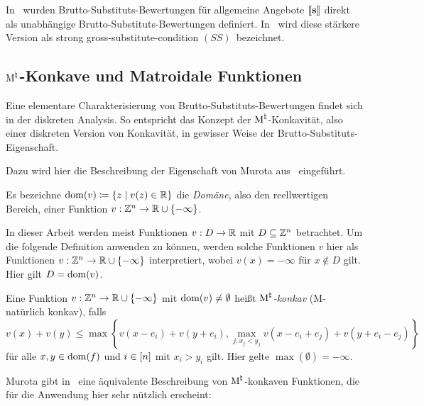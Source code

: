 \begin{bemerkung}
	In~\cite{PaesLeme2018} wurden Brutto-Substituts-Bewertungen für allgemeine Angebote $\left\llbracket \mathbf{s} \right\rrbracket$ direkt als unabhängige Brutto-Substituts-Bewertungen definiert.
	In~\cite{AkiyoshiShioura2015} wird diese stärkere Version als \glqq strong gross-substitute-condition $(SS)$\grqq\ bezeichnet.
\end{bemerkung}

\subsection{$\textrm{\textup{M}}^\natural$-Konkave und Matroidale Funktionen}\label{section-m-concavity}

Eine elementare Charakterisierung von Brutto-Substituts-Bewertungen findet sich in der diskreten Analysis.
So entspricht das Konzept der $\textrm{\textup{M}}^\natural$-Konkavität, also einer diskreten Version von Konkavität, in gewisser Weise der Brutto-Substituts-Eigenschaft.

Dazu wird hier die Beschreibung der Eigenschaft von Murota aus~\cite[Theorem~6.2 bzw.~Abschnitt~11.3]{Murota2003} eingeführt.

\begin{definition}
	Es bezeichne $\operatorname{dom}(v)\coloneqq \{ z \mid v(z)\in\mathbb{R} \}$ die \emph{Domäne}, also den reellwertigen Bereich, einer Funktion $v:\mathbb{Z}^n \rightarrow \mathbb{R} \cup \{ -\infty\}$.
\end{definition}

In dieser Arbeit werden meist Funktionen $v: D\rightarrow \mathbb{R}$ mit $D\subseteq \mathbb{Z}^n$ betrachtet.
Um die folgende Definition anwenden zu können, werden solche Funktionen $v$ hier als Funktionen $v: \mathbb{Z}^n\rightarrow \mathbb{R} \cup \{ -\infty\}$ interpretiert, wobei $v(x) = -\infty$ für $x\notin D$ gilt.
Hier gilt $D = \operatorname{dom}(v)$.

\begin{definition}
	Eine Funktion $v:\mathbb{Z}^n \rightarrow \mathbb{R} \cup \{-\infty\}$ mit $\operatorname{dom}(v) \neq \emptyset$ heißt \emph{$\textrm{\textup{M}}^\natural$-konkav} (\glqq M-natürlich konkav\grqq), falls \[
	v(x) + v(y) \leq
	\max \left\{
		v(x - e_i) + v(y + e_i),
		\max_{j: x_j < y_j} v(x - e_i + e_j) + v(y + e_i - e_j)
	\right\}
	\] für alle $x,y\in\operatorname{dom}(f)$ und $i\in\left[ n \right]$ mit $x_i > y_i$ gilt.
	Hier gelte $\max(\emptyset)=-\infty$.
\end{definition}


Murota gibt in~\cite[Theorem~6.24 bzw. Abschnitt~11.3]{Murota2003} eine äquivalente Beschreibung von $\textrm{\textup{M}}^\natural$-konkaven Funktionen, die für die Anwendung hier sehr nützlich erscheint:

